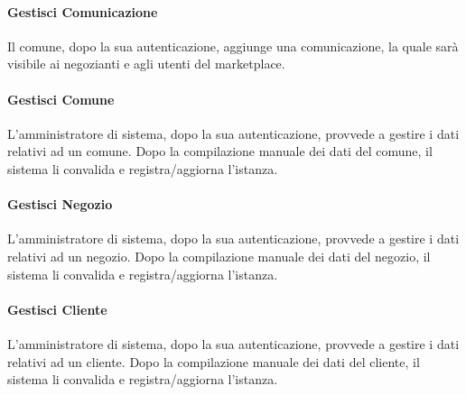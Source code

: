 \paragraph{Gestisci Comunicazione} Il comune, dopo la sua autenticazione, aggiunge una comunicazione, la quale sarà visibile ai negozianti e agli utenti del marketplace.
\paragraph{Gestisci Comune} L'amministratore di sistema, dopo la sua autenticazione, provvede a gestire i dati relativi ad un comune. Dopo la compilazione manuale dei dati del comune, il sistema li convalida e registra/aggiorna l'istanza. 
\paragraph{Gestisci Negozio} L'amministratore di sistema, dopo la sua autenticazione, provvede a gestire i dati relativi ad un negozio. Dopo la compilazione manuale dei dati del negozio, il sistema li convalida e registra/aggiorna l'istanza. 
\paragraph{Gestisci Cliente} L'amministratore di sistema, dopo la sua autenticazione, provvede a gestire i dati relativi ad un cliente. Dopo la compilazione manuale dei dati del cliente, il sistema li convalida e registra/aggiorna l'istanza.

